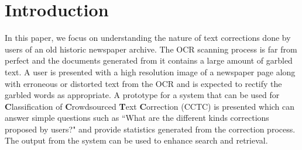 \documentclass{acm_proc_article-sp}
\begin{document}
\section{Introduction}
\label{sec:intro}
%
%

In this paper, we focus on understanding the nature of text corrections done by users of an old historic newspaper archive. 
The OCR scanning process is far from perfect and the documents generated from it contains a large amount of garbled text. A user is presented with a high resolution image of a newspaper page along with erroneous or distorted text from the OCR and is expected to rectify the garbled words as appropriate. A prototype for a system that can be used for \textbf{C}lassification of \textbf{C}rowdsourced \textbf{T}ext \textbf{C}orrection (CCTC) is presented which can answer simple questions such as ``What are the different kinds corrections proposed by users?" and provide statistics generated from the correction process. The output from the system can be used to enhance search and retrieval.
\end{document}
